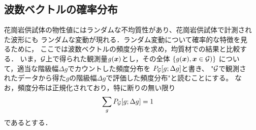 \subsection{波数ベクトルの確率分布}
花崗岩供試体の物性値にはランダムな不均質性があり、花崗岩供試体で計測された波形にも
ランダムな変動が現れる．ランダム変動について確率的な特徴を見るために，
ここでは波数ベクトルの頻度分布を求め，均質材での結果と比較する．
いま，$\cal G$上で得られた観測量$g(\mbox{\boldmath{$x$}})$とし，その全体
$\left\{ g(\fat{x}), \fat{x}\in {\cal G}) \right\}$
について，適当な階級幅$\Delta g$でカウントした頻度分布を
$P_{\cal G} [g;\Delta g]$と書き、
"${\cal G}$で観測されたデータから得た$g$の階級幅$\Delta g$で評価した頻度分布"と読むことにする。
なお，頻度分布は正規化されており，特に断りの無い限り
\begin{equation}
	\sum_{g} P_{\cal G}[g;\Delta g]=1
	\label{eqn:normalize}
\end{equation}
であるとする．

